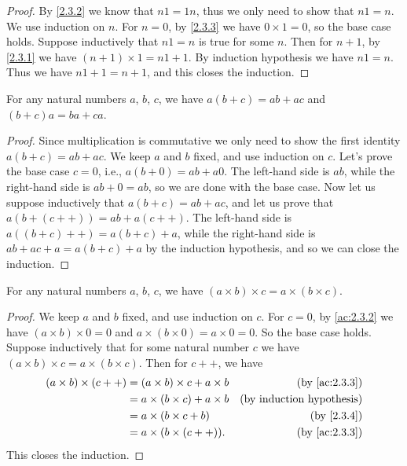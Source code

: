 \begin{proof}
  By \cref{2.3.2} we know that \(n1 = 1n\), thus we only need to show that \(n1 = n\).
  We use induction on \(n\).
  For \(n=0\), by \cref{2.3.3} we have \(0 \times 1 = 0\), so the base case holds.
  Suppose inductively that \(n1 = n\) is true for some \(n\).
  Then for \(n + 1\), by \cref{2.3.1} we have \((n + 1) \times 1 = n1 + 1\).
  By induction hypothesis we have \(n1 = n\).
  Thus we have \(n1 + 1 = n + 1\), and this closes the induction.
\end{proof}

\begin{prop}\label{2.3.4}
  For any natural numbers \(a\), \(b\), \(c\), we have \(a(b + c) = ab + ac\) and \((b + c)a = ba + ca\).
\end{prop}

\begin{proof}
  Since multiplication is commutative we only need to show the first identity \(a(b + c) = ab + ac\).
  We keep \(a\) and \(b\) fixed, and use induction on \(c\).
  Let's prove the base case \(c = 0\), i.e., \(a(b + 0) = ab + a0\).
  The left-hand side is \(ab\), while the right-hand side is \(ab + 0 = ab\), so we are done with the base case.
  Now let us suppose inductively that \(a(b + c) = ab + ac\), and let us prove that \(a(b + (c++)) = ab + a(c++)\).
  The left-hand side is \(a((b + c)++) = a(b + c) + a\), while the right-hand side is \(ab + ac + a = a(b + c) + a\) by the induction hypothesis, and so we can close the induction.
\end{proof}

\begin{prop}\label{2.3.5}
  For any natural numbers \(a\), \(b\), \(c\), we have \((a \times b) \times c = a \times (b \times c)\).
\end{prop}

\begin{proof}
  We keep \(a\) and \(b\) fixed, and use induction on \(c\).
  For \(c = 0\), by \cref{ac:2.3.2} we have \((a \times b) \times 0 = 0\) and \(a \times (b \times 0) = a \times 0 = 0\).
  So the base case holds.
  Suppose inductively that for some natural number \(c\) we have \((a \times b) \times c = a \times (b \times c)\).
  Then for \(c++\), we have
  \begin{align*}
    (a \times b) \times (c++) & = (a \times b) \times c + a \times b & \text{(by \cref{ac:2.3.3})}      \\
                              & = a \times (b \times c) + a \times b & \text{(by induction hypothesis)} \\
                              & = a \times (b \times c + b)          & \text{(by \cref{2.3.4})}         \\
                              & = a \times (b \times (c++)).         & \text{(by \cref{ac:2.3.3})}
  \end{align*}
  This closes the induction.
\end{proof}

